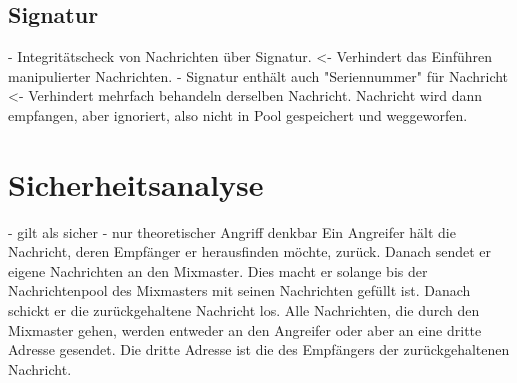 \subsection{Signatur}
- Integritätscheck von Nachrichten über Signatur. <- Verhindert das Einführen manipulierter Nachrichten.
- Signatur enthält auch "Seriennummer" für Nachricht <- Verhindert mehrfach behandeln derselben Nachricht. Nachricht wird dann empfangen, aber ignoriert, also nicht in Pool gespeichert und weggeworfen.

\section{Sicherheitsanalyse}
- gilt als sicher
- nur theoretischer Angriff denkbar
Ein Angreifer hält die Nachricht, deren Empfänger er herausfinden möchte, zurück. Danach sendet er eigene Nachrichten an den Mixmaster. Dies macht er solange bis der Nachrichtenpool des Mixmasters mit seinen Nachrichten gefüllt ist. Danach schickt er die zurückgehaltene Nachricht los. Alle Nachrichten, die durch den Mixmaster gehen, werden entweder an den Angreifer oder aber an eine dritte Adresse gesendet. Die dritte Adresse ist die des Empfängers der zurückgehaltenen Nachricht.
